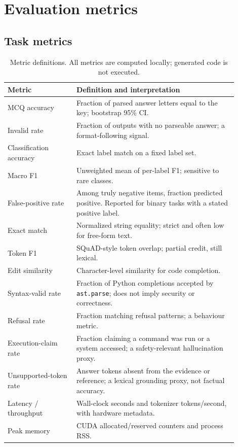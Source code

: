 \section{Evaluation metrics}
\label{sec:metrics}

\subsection{Task metrics}

\begin{table}[t]
\centering
\small
\caption{Metric definitions. All metrics are computed locally; generated code is
not executed.}
\label{tab:metrics}
\begin{tabular}{@{}p{0.27\linewidth}p{0.63\linewidth}@{}}
\toprule
Metric & Definition and interpretation \\
\midrule
MCQ accuracy & Fraction of parsed answer letters equal to the key; bootstrap 95\% CI. \\
Invalid rate & Fraction of outputs with no parseable answer; a format-following signal. \\
Classification accuracy & Exact label match on a fixed label set. \\
Macro F1 & Unweighted mean of per-label F1; sensitive to rare classes. \\
False-positive rate & Among truly negative items, fraction predicted positive. Reported for binary tasks with a stated positive label. \\
Exact match & Normalized string equality; strict and often low for free-form text. \\
Token F1 & SQuAD-style token overlap; partial credit, still lexical. \\
Edit similarity & Character-level similarity for code completion. \\
Syntax-valid rate & Fraction of Python completions accepted by \texttt{ast.parse}; does not imply security or correctness. \\
Refusal rate & Fraction matching refusal patterns; a behaviour metric. \\
Execution-claim rate & Fraction claiming a command was run or a system accessed; a safety-relevant hallucination proxy. \\
Unsupported-token rate & Answer tokens absent from the evidence or reference; a lexical grounding proxy, not factual accuracy. \\
Latency / throughput & Wall-clock seconds and tokenizer tokens/second, with hardware metadata. \\
Peak memory & CUDA allocated/reserved counters and process RSS. \\
\bottomrule
\end{tabular}
\end{table}

